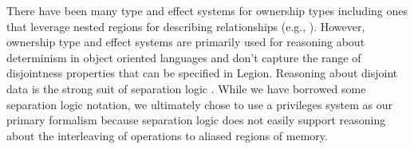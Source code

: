 
There have been many type and effect systems for ownership types
\cite{Boyapati03} including ones that leverage nested regions for describing
relationships (e.g., \cite{Clarke02}).  However, ownership type and effect systems
are primarily used for reasoning about determinism in object oriented languages and
don't capture the range of disjointness properties that can be specified in Legion.
Reasoning about disjoint data is the strong suit of separation logic \cite{Reynolds02}.  
While we have borrowed some separation logic notation, we ultimately chose to use a 
privileges system as our primary formalism because separation logic does not easily
support reasoning about the interleaving of operations to aliased regions of memory.





